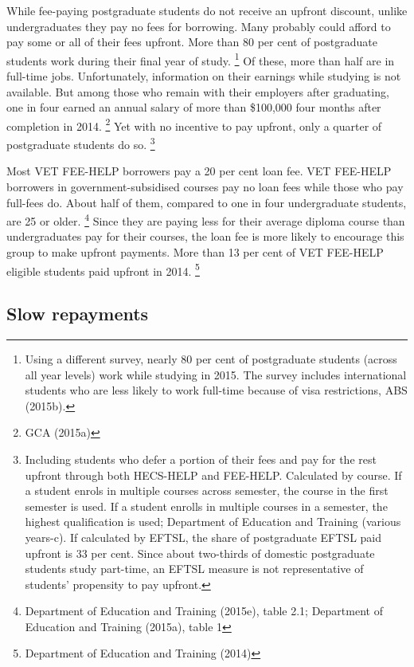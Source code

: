\documentclass[embargoed]{grattan}
\begin{document}
While fee-paying postgraduate students do not receive an upfront discount, unlike undergraduates they pay no fees for borrowing.
Many probably could afford to pay some or all of their fees upfront.
More than 80 per cent of postgraduate students work during their final year of study.%
\footnote{Using a different survey, nearly 80 per cent of postgraduate students (across all year levels) work while studying in 2015.
The survey includes international students who are less likely to work full-time because of visa restrictions, ABS (2015b).} Of these, more than half are in full-time jobs.
Unfortunately, information on their earnings while studying is not available.
But among those who remain with their employers after graduating, one in four earned an annual salary of more than \$100,000 four months after completion in 2014.%
\footnote{GCA (2015a)} Yet with no incentive to pay upfront, only a quarter of postgraduate students do so.%
\footnote{Including students who defer a portion of their fees and pay for the rest upfront through both HECS-HELP and FEE-HELP.
Calculated by course.
If a student enrols in multiple courses across semester, the course in the first semester is used.
If a student enrolls in multiple courses in a semester, the highest qualification is used; Department of Education and Training (various years-c).
If calculated by EFTSL, the share of postgraduate EFTSL paid upfront is 33 per cent.
Since about two-thirds of domestic postgraduate students study part-time, an EFTSL measure is not representative of students' propensity to pay upfront.}

Most VET FEE-HELP borrowers pay a 20 per cent loan fee.
VET FEE-HELP borrowers in government-subsidised courses pay no loan fees while those who pay full-fees do.
About half of them, compared to one in four undergraduate students, are 25 or older.%
\footnote{Department of Education and Training (2015e), table 2.1; Department of Education and Training (2015a), table 1} Since they are paying less for their average diploma course than undergraduates pay for their courses, the loan fee is more likely to encourage this group to make upfront payments.
More than 13 per cent of VET FEE-HELP eligible students paid upfront in 2014.%
\footnote{Department of Education and Training (2014)}

\subsection{Slow repayments }\label{slow-repayments}
\end{document}
